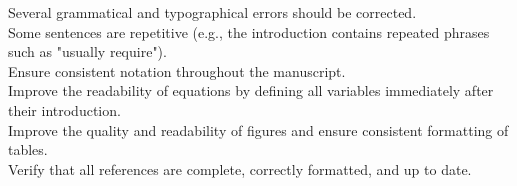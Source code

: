 \documentclass{ar2rc}
\begin{document}
\begin{tcolorbox}[title = {The Reviewer \#1's Comment 6}]
Several grammatical and typographical errors should be corrected. \\
Some sentences are repetitive (e.g., the introduction contains repeated phrases such as "usually require"). \\
Ensure consistent notation throughout the manuscript. \\
Improve the readability of equations by defining all variables immediately after their introduction. \\
Improve the quality and readability of figures and ensure consistent formatting of tables. \\
Verify that all references are complete, correctly formatted, and up to date.
\end{tcolorbox}
\end{document}
